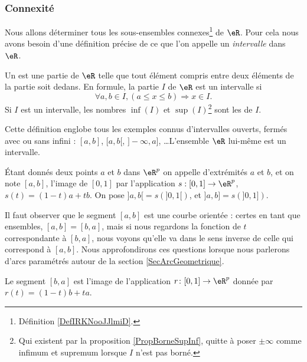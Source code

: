 \subsubsection{Connexité}

Nous allons déterminer tous les sous-ensembles connexes\footnote{Définition \ref{DefIRKNooJJlmiD}.} de $\eR$. Pour cela nous avons besoin d'une définition précise de ce que l'on appelle un \emph{intervalle} dans~$\eR$.
\begin{definition}  \label{DefEYAooMYYTz}
    Un  est une partie de $\eR$ telle que tout élément compris entre deux éléments de la partie soit dedans. En formule, la partie $I$ de $\eR$ est un intervalle si
    \[
      \forall a,b\in I,(a\leq x\leq b)\Rightarrow x\in I.
    \]
    Si \( I\) est un intervalle, les nombres \( \inf(I)\) et \( \sup(I)\)\footnote{Qui existent par la proposition \ref{PropBorneSupInf}, quitte à poser \( \pm\infty\) comme infimum et supremum lorsque \( I\) n'est pas borné.} sont les  de \( I\).
\end{definition}
Cette définition englobe tous les exemples connus d'intervalles ouverts, fermés avec ou sans infini : $[a,b]$, $[a,b[$, $]-\infty,a]$, \ldots L'ensemble \( \eR\) lui-même est un intervalle.

\begin{definition}      \label{DefLISOooDHLQrl}
	Étant donnés deux points $a$ et $b$ dans $\eR^p$ on appelle  d'extrémités $a$ et $b$, et on note $[a,b]$, l'image de $[0,1]$ par l'application $s: [0,1]\to \eR^p$, $s(t)= (1-t)a+tb$.  On pose $]a,b[=s\left(]0,1[\right)$, et  $]a,b]=s\left(]0,1]\right)$. 
\end{definition}
Il faut observer que le segment $[a,b]$ est une courbe orientée : certes en tant que ensembles, $[a,b]=[b,a]$, mais si nous regardons la fonction de $t$ correspondante à $[b,a]$, nous voyons qu'elle va dans le sens inverse de celle qui correspond à $[a,b]$. Nous approfondirons ces questions lorsque nous parlerons d'arcs paramétrés autour de la section \ref{SecArcGeometrique}.

Le segment $[b,a]$ est l'image de l'application $r\colon [0,1]\to \eR^p$ donnée par $r(t)=(1-t)b+ta$.

